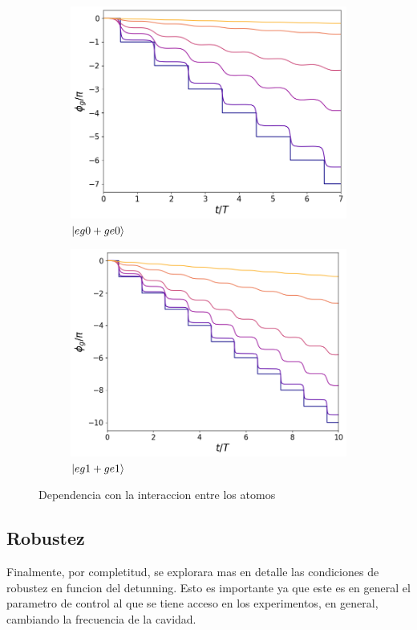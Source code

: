 \begin{figure}[h]
    \centering
    \begin{subfigure}{0.49\textwidth}
        \includegraphics[width=\textwidth]{figuras/ch5/dependencia/eg0+/interaccion todo 0.png}
        \caption{$\ket{eg0+ge0}$}
        \label{fig5:dependencia interaccion eg0}
    \end{subfigure}
    \hfill
    \begin{subfigure}{0.49\textwidth}
        \includegraphics[width=\textwidth]{figuras/ch5/dependencia/eg1+/interaccion todo 0.png}
        \caption{$\ket{eg1+ge1}$}
        \label{fig5:dependencia interaccion eg1}
    \end{subfigure}
    \caption{Dependencia con la interaccion entre los atomos}
    \label{fig5:dependencia interaccion}
\end{figure}
\subsection{Robustez}
Finalmente, por completitud, se explorara mas en detalle las condiciones de robustez en funcion del detunning. Esto es importante ya que este es en general el parametro de control al que se tiene acceso en los experimentos, en general, cambiando la frecuencia de la cavidad.



